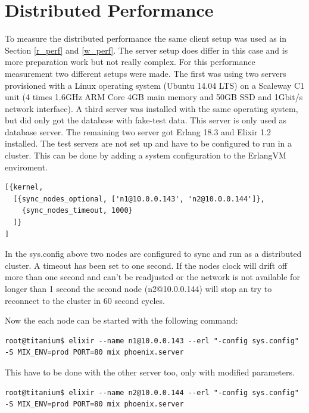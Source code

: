 \section{Distributed Performance}\label{d_perf}
{\color{newcode}To measure the distributed performance the same client setup was used as in Section \ref{r_perf} and \ref{w_perf}. The server setup does differ in this case and is more preparation work but not really complex. 
For this performance measurement two different setups were made. The first was using two servers provisioned with a Linux operating system (Ubuntu 14.04 LTS) on a Scaleway C1 unit (4 times 1.6GHz ARM Core 4GB main memory and 50GB SSD and 1Gbit/s network interface). A third server was installed with the same operating system, but did only got the database with fake-test data. This server is only  used as database server. The remaining two server got Erlang 18.3 and Elixir 1.2 installed. The test servers are not set up and have to be configured to run in a cluster. This can be done by adding a system configuration to the ErlangVM enviroment.

\begin{lstlisting}[caption={sys.config},label=lst:nodecondig]
[{kernel,
  [{sync_nodes_optional, ['n1@10.0.0.143', 'n2@10.0.0.144']},
    {sync_nodes_timeout, 1000}
  ]}
]
\end{lstlisting}

In the sys.config above two nodes are configured to sync and run as a distributed cluster. A timeout has been set to one second. If the nodes clock will drift off more than one second and can't be readjusted or the network is not available for longer than 1 second the second node (n2@10.0.0.144) will stop an try to reconnect to the cluster in 60 second cycles. 

Now the each node can be started with the following command:

\begin{lstlisting}
root@titanium$ elixir --name n1@10.0.0.143 --erl "-config sys.config" -S MIX_ENV=prod PORT=80 mix phoenix.server
\end{lstlisting}


This have to be done with the other server too, only with modified parameters.

\begin{lstlisting}
root@titanium$ elixir --name n2@10.0.0.144 --erl "-config sys.config" -S MIX_ENV=prod PORT=80 mix phoenix.server
\end{lstlisting}

}
